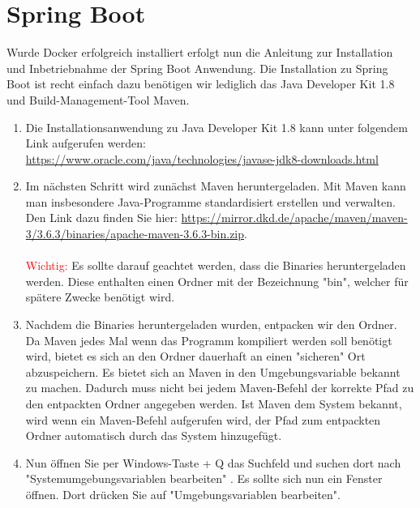 \section{Spring Boot}\label{SpringInstal}

Wurde Docker erfolgreich installiert erfolgt nun die Anleitung zur Installation und Inbetriebnahme der Spring Boot Anwendung.
Die Installation zu Spring Boot ist recht einfach dazu benötigen wir lediglich das Java Developer Kit 1.8 und  Build-Management-Tool Maven.

\begin{enumerate}
    \item Die Installationsanwendung zu Java Developer Kit 1.8 kann unter folgendem Link aufgerufen werden:\\\href{https://www.oracle.com/java/technologies/javase-jdk8-downloads.html}{https://www.oracle.com/java/technologies/javase-jdk8-downloads.html}
    
    \item Im nächsten Schritt wird zunächst Maven heruntergeladen. Mit Maven kann man insbesondere Java-Programme standardisiert erstellen und verwalten. Den Link dazu finden Sie hier: \href{https://mirror.dkd.de/apache/maven/maven-3/3.6.3/binaries/apache-maven-3.6.3-bin.zip}{https://mirror.dkd.de/apache/maven/maven-3/3.6.3/binaries/apache-maven-3.6.3-bin.zip}.\\\\\textcolor{red}{Wichtig:} Es sollte darauf geachtet werden, dass die Binaries heruntergeladen werden. Diese enthalten einen Ordner mit der Bezeichnung "bin"{}, welcher für spätere Zwecke benötigt wird.
    
    \item Nachdem die Binaries heruntergeladen wurden, entpacken wir den Ordner. Da Maven jedes Mal wenn das Programm kompiliert werden soll benötigt wird, bietet es sich an den Ordner dauerhaft an einen "sicheren"{} Ort abzuspeichern. Es bietet sich an Maven in den Umgebungsvariable bekannt zu machen. Dadurch muss nicht bei jedem Maven-Befehl der korrekte Pfad zu den entpackten Ordner angegeben werden. Ist Maven dem System bekannt, wird wenn ein Maven-Befehl aufgerufen wird, der Pfad zum entpackten Ordner automatisch durch das System hinzugefügt.
    
    \item Nun öffnen Sie per Windows-Taste + Q das Suchfeld und suchen dort nach "{}Systemumgebungsvariablen bearbeiten"{} . Es sollte sich nun ein Fenster öffnen. Dort drücken Sie auf "Umgebungsvariablen bearbeiten"{}.
    

\end{enumerate}
